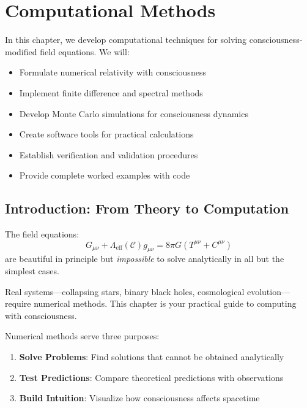 \chapter{Computational Methods}
\label{ch:computational-methods}

\begin{chapterobjectives}
In this chapter, we develop computational techniques for solving consciousness-modified field equations. We will:
\begin{itemize}
\item Formulate numerical relativity with consciousness
\item Implement finite difference and spectral methods
\item Develop Monte Carlo simulations for consciousness dynamics
\item Create software tools for practical calculations
\item Establish verification and validation procedures
\item Provide complete worked examples with code
\end{itemize}
\end{chapterobjectives}

\section{Introduction: From Theory to Computation}

\begin{intuitive}
The field equations:
\begin{equation}
G_{\mu\nu} + \Lambda_{\text{eff}}(\mathcal{C}) g_{\mu\nu} = 8\pi G \left( T^{\mu\nu} + C^{\mu\nu} \right)
\end{equation}
are beautiful in principle but \textit{impossible} to solve analytically in all but the simplest cases.

Real systems---collapsing stars, binary black holes, cosmological evolution---require numerical methods. This chapter is your practical guide to computing with consciousness.
\end{intuitive}

Numerical methods serve three purposes:
\begin{enumerate}
\item \textbf{Solve Problems}: Find solutions that cannot be obtained analytically
\item \textbf{Test Predictions}: Compare theoretical predictions with observations
\item \textbf{Build Intuition}: Visualize how consciousness affects spacetime
\end{enumerate}

